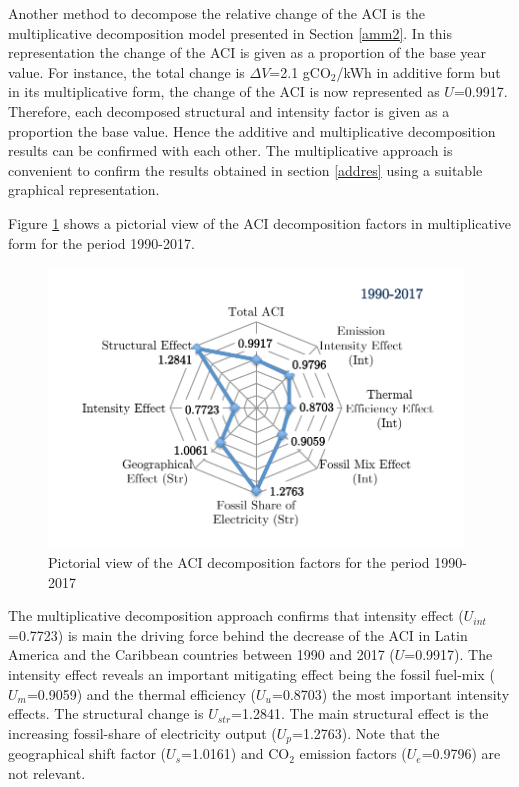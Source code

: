 \documentclass[energies,article,accept,moreauthors,12pt,a4paper]{mdpi} %
\begin{document}
Another method to decompose the relative change of the ACI is the multiplicative decomposition model presented in Section \ref{amm2}. In this representation the change of the ACI is given as a proportion of the base year value. For instance, the total change is $\Delta V$=2.1 gCO$_2$/kWh in additive form but in its multiplicative form, the change of the ACI is now represented as $ U$=0.9917. Therefore, each decomposed structural and intensity factor is given as a proportion the base value.
Hence the additive and multiplicative
decomposition results can be confirmed with each other. The multiplicative approach is convenient to confirm the results obtained in section \ref{addres} using a suitable graphical representation.

  Figure  \ref{main6} shows a pictorial view of the ACI decomposition factors in multiplicative form for the period 1990-2017.

 

            \begin{figure}[!ht] \centerline{
     \includegraphics[width=11cm]{images/main6.pdf}}
       \caption{Pictorial view of the ACI decomposition factors for the period 1990-2017}
      \label{main6}
        \end{figure}


The multiplicative decomposition approach confirms that intensity effect ($U_{int}$=0.7723) is main the driving force behind the decrease of the ACI in Latin America and the Caribbean countries between 1990 and 2017 ($U$=0.9917). The intensity effect reveals an important mitigating effect being the fossil fuel-mix ($U_{m}$=0.9059) and the thermal efficiency ($U_{u}$=0.8703) the most important intensity effects. The structural change is $U_{str}$=1.2841. The main structural effect is the increasing fossil-share of electricity output ($U_{p}$=1.2763). Note that the geographical shift factor ($U_{s}$=1.0161) and CO$_2$ emission factors ($U_{e}$=0.9796) are not relevant.
\end{document}
